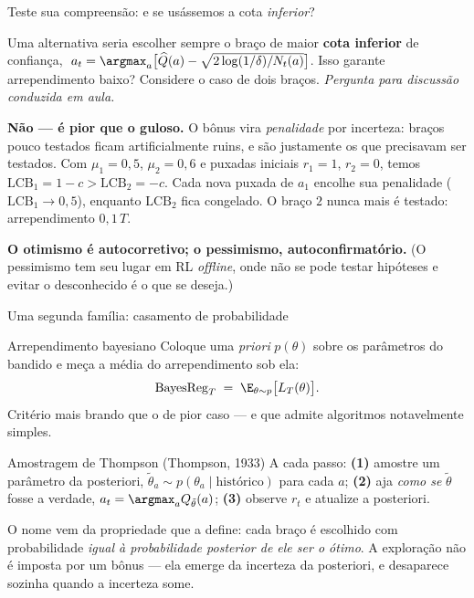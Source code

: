 \documentclass[aspectratio=169, 10pt]{beamer}
\newcommand{\paradiscussao}{\smallskip
  {\footnotesize\color{rlCinza}\itshape Pergunta para discussão conduzida em aula.}}
\newcommand{\Qhat}{\widehat{Q}}
\newcommand{\Nc}{N}                         %
\newcommand{\LCB}{\mathrm{LCB}}
\newcommand{\Reg}{L}
\begin{document}
\begin{frame}{Teste sua compreensão: e se usássemos a cota \emph{inferior}?}
  \begin{quizbox}{}
    Uma alternativa seria escolher sempre o braço de maior \textbf{cota
    inferior} de confiança,
    $\;a_t = \argmax_a \bigl[\Qhat(a) - \sqrt{2\log(1/\delta)/\Nc_t(a)}\bigr]$.
    Isso garante arrependimento baixo? Considere o caso de dois braços.
    \paradiscussao
  \end{quizbox}

  \pause

  \begin{respbox}[fontupper=\footnotesize]
    \textbf{Não --- é pior que o guloso.} O bônus vira \emph{penalidade}
    por incerteza: braços pouco testados ficam artificialmente ruins, e são
    justamente os que precisavam ser testados. Com
    $\mu_1 = 0{,}5$, $\mu_2 = 0{,}6$ e puxadas iniciais $r_1 = 1$,
    $r_2 = 0$, temos $\LCB_1 = 1 - c > \LCB_2 = -c$. Cada nova puxada de
    $a_1$ encolhe sua penalidade ($\LCB_1 \to 0{,}5$), enquanto $\LCB_2$
    fica congelado. O braço $2$ nunca mais é testado: arrependimento
    $0{,}1\,T$.
  \end{respbox}

  \begin{ideiabox}[fontupper=\footnotesize]
    \textbf{O otimismo é autocorretivo; o pessimismo, autoconfirmatório.}
    (O pessimismo tem seu lugar em RL \emph{offline}, onde não se pode
    testar hipóteses e evitar o desconhecido é o que se deseja.)
  \end{ideiabox}
\end{frame}

\begin{frame}{Uma segunda família: casamento de probabilidade}
  \begin{defbox}{Arrependimento bayesiano}
    Coloque uma \emph{priori} $p(\theta)$ sobre os parâmetros do bandido e
    meça a média do arrependimento sob ela:
    \[
      \mathrm{BayesReg}_T \;=\; \E_{\theta \sim p}\bigl[\Reg_T(\theta)\bigr].
    \]
    Critério mais brando que o de pior caso --- e que admite algoritmos
    notavelmente simples.
  \end{defbox}

  \begin{algbox}{Amostragem de Thompson (Thompson, 1933)}
    A cada passo: \textbf{(1)} amostre um parâmetro da posteriori,
    $\tilde\theta_a \sim p(\theta_a \mid \text{histórico})$ para cada $a$;
    \textbf{(2)} aja \emph{como se} $\tilde\theta$ fosse a verdade,
    $a_t = \argmax_a Q_{\tilde\theta}(a)$; \textbf{(3)} observe $r_t$ e
    atualize a posteriori.
  \end{algbox}

  \begin{ideiabox}
    O nome vem da propriedade que a define: cada braço é escolhido com
    probabilidade \emph{igual à probabilidade posterior de ele ser o
    ótimo}. A exploração não é imposta por um bônus --- ela emerge da
    incerteza da posteriori, e desaparece sozinha quando a incerteza some.
  \end{ideiabox}
\end{frame}
\end{document}
